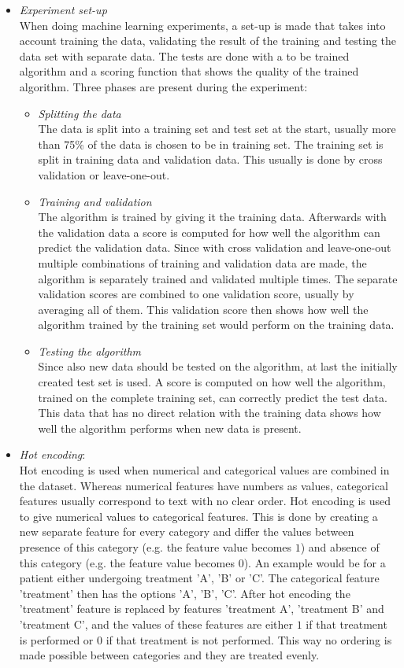 \documentclass[10pt,a4paper]{report}
\begin{document}
\begin{itemize}
		\item \textit{Experiment set-up} \\
		When doing machine learning experiments, a set-up is made that takes into account training the data, validating the result of the training and testing the data set with separate data. The tests are done with a to be trained algorithm and a scoring function that shows the quality of the trained algorithm.  Three phases are present during the experiment:
		\begin{itemize}
			\item \textit{Splitting the data} \\
			The data is split into a training set and test set at the start, usually more than 75\% of the data is chosen to be in training set. The training set is split in training data and validation data. This usually is done by cross validation or leave-one-out. 
			\item \textit{Training and validation} \\
			The algorithm is trained by giving it the training data. Afterwards with the validation data a score is computed for how well the algorithm can predict the validation data. Since with cross validation and leave-one-out multiple combinations of training and validation data are made, the algorithm is separately trained and validated multiple times. The separate validation scores are combined to one validation score, usually by averaging all of them. This validation score then shows how well the algorithm trained by the training set would perform on the training data.
			\item \textit{Testing the algorithm} \\
			Since also new data should be tested on the algorithm, at last the initially created test set is used. A score is computed on how well the algorithm, trained on the complete training set, can correctly predict the test data. This data that has no direct relation with the training data shows how well the algorithm performs when new data is present.
		\end{itemize}
		\item \textit{Hot encoding}:\\
		Hot encoding is used when numerical and categorical values are combined in the dataset. Whereas numerical features have numbers as values, categorical features usually correspond to text with no clear order. Hot encoding is used to give numerical values to categorical features. This is done by creating a new separate feature for every category and differ the values between presence of this category (e.g. the feature value becomes $1$) and absence of this category (e.g. the feature value becomes $0$). An example would be for a patient either undergoing treatment 'A', 'B' or 'C'. The categorical feature 'treatment' then has the options {'A', 'B', 'C'}. After hot encoding the 'treatment' feature is replaced by features 'treatment A', 'treatment B' and 'treatment C', and the values of these features are either $1$ if that treatment is performed or $0$ if that treatment is not performed. This way no ordering is made possible between categories and they are treated evenly.

\end{itemize}
\end{document}
